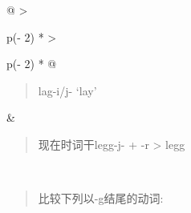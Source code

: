 \begin{longtable}[]{@{}
  >{\raggedright\arraybackslash}p{(\columnwidth - 2\tabcolsep) * }
  >{\raggedright\arraybackslash}p{(\columnwidth - 2\tabcolsep) * }@{}}
  \toprule\noalign{}
  \begin{minipage}[b]{\linewidth}\raggedright
    \begin{quote}
      lag-i/j- `lay‌'
    \end{quote}
  \end{minipage} & \begin{minipage}[b]{\linewidth}\raggedright
                     \begin{quote}
      现在时词干legg-j- + -r \textgreater{} legg
    \end{quote}
                   \end{minipage} \\
  \midrule\noalign{}
  \endhead
  \bottomrule\noalign{}
  \endlastfoot
\end{longtable}

\begin{quote}
  比较下列以-g结尾的动词:
\end{quote}

